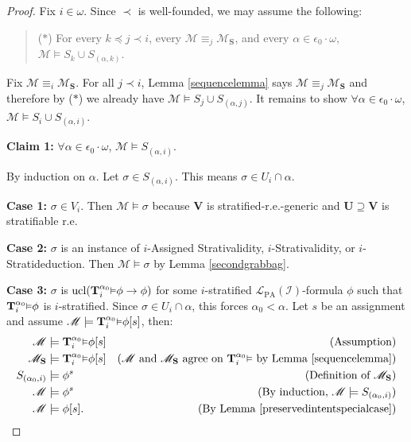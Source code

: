 \documentclass[reqno]{article}
\theoremstyle{definition}
\def\L{\mathscr{L}}
\def\M{\mathscr{M}}
\def\T{\mathbf{T}}
\def\S{\mathbf{S}}
\def\U{\mathbf{U}}
\def\V{\mathbf{V}}
\def\LPA{\L_{\mathrm{PA}}}
\def\epom{\epsilon_0\cdot\omega}
\def\indset{\mathcal I}
\def\myequiv{\equiv}
\newcommand{\Prr}[2]{\T^{#1}_{#2}\mbox{\small${\vDash}$}}
\newcommand{\ucl}[1]{\mathrm{ucl}(#1)}
\newcommand{\case}[1]{\textbf{Case #1:}}
\newcommand{\claim}[1]{\textbf{Claim #1:}}
\begin{document}
\begin{proof}
Fix $i\in\omega$.  Since $\prec$ is well-founded, we may assume the following:
\begin{quote}
($*$) For every $k\preceq j\prec i$,
every $\M\myequiv_j\M_\S$, and every $\alpha\in\epom$,
$\M\models S_k\cup S_{(\alpha,k)}$.
\end{quote}
Fix $\M\myequiv_i\M_\S$.
For all $j\prec i$,
Lemma \ref{sequencelemma} says $\M\myequiv_j\M_\S$
and therefore by ($*$) we already have $\M\models S_j\cup S_{(\alpha,j)}$.
It remains to show $\forall \alpha\in\epom$, $\M\models S_i\cup S_{(\alpha,i)}$.

\item
\claim1
$\forall \alpha\in\epom$, $\M\models S_{(\alpha,i)}$.

\item
By induction on $\alpha$.
Let $\sigma\in S_{(\alpha,i)}$.
This means $\sigma\in U_i\cap\alpha$.

\item
\case1
$\sigma\in V_i$.
Then $\M\models\sigma$ because
$\V$ is stratified-r.e.-generic and $\U\supseteq\V$
is stratifiable r.e.

\item
\case2
$\sigma$ is an instance of $i$-Assigned Strativalidity, $i$-Strativalidity,
or $i$-Stratideduction.  Then $\M\models\sigma$
by Lemma \ref{secondgrabbag}.

\item
\case3
$\sigma$ is $\ucl{\Prr{\alpha_0} i\phi\rightarrow\phi}$ for some
$i$-stratified $\LPA(\indset)$-formula $\phi$ such that $\Prr{\alpha_0}i\phi$ is $i$-stratified.
Since $\sigma\in U_i\cap\alpha$, this forces $\alpha_0<\alpha$.
Let $s$ be an assignment and assume $\M\models\Prr{\alpha_0}i\phi[s]$, then:
\begin{align*}
\M &\models \Prr{\alpha_0} i\phi[s]
  &\mbox{(Assumption)}\\
\M_\S &\models \Prr{\alpha_0} i\phi[s]
  &\mbox{($\M$ and $\M_\S$ agree on $\Prr{\alpha_0} i$ by Lemma \ref{sequencelemma})}\\
S_{(\alpha_0,i)} &\models \phi^s
  &\mbox{(Definition of $\M_\S$)}\\
\M &\models \phi^s
  &\mbox{(By induction, $\M\models S_{(\alpha_0,i)}$)}\\
\M &\models \phi[s].
  &\mbox{(By Lemma \ref{preservedintentspecialcase})}
\end{align*}



\end{proof}
\end{document}
